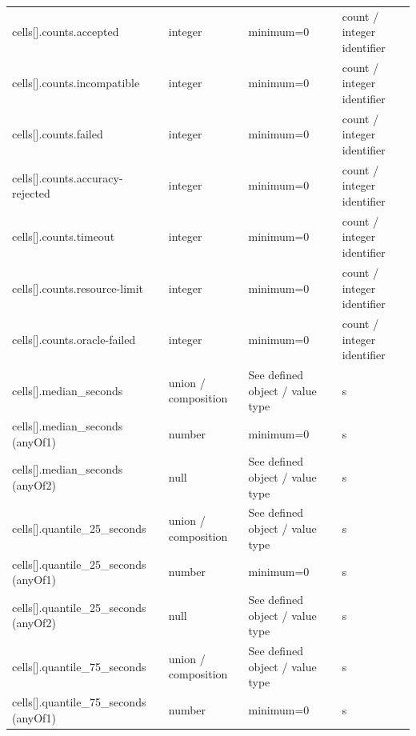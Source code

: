 \begin{longtable}{@{}>{\raggedright\arraybackslash}p{}>{\raggedright\arraybackslash}p{}>{\raggedright\arraybackslash}p{}>{\raggedright\arraybackslash}p{}@{}}
cells[].\allowbreak{}counts.\allowbreak{}accepted & integer & minimum=\allowbreak{}0 & count /\allowbreak{} integer identifier\\
cells[].\allowbreak{}counts.\allowbreak{}incompatible & integer & minimum=\allowbreak{}0 & count /\allowbreak{} integer identifier\\
cells[].\allowbreak{}counts.\allowbreak{}failed & integer & minimum=\allowbreak{}0 & count /\allowbreak{} integer identifier\\
cells[].\allowbreak{}counts.\allowbreak{}accuracy-\allowbreak{}rejected & integer & minimum=\allowbreak{}0 & count /\allowbreak{} integer identifier\\
cells[].\allowbreak{}counts.\allowbreak{}timeout & integer & minimum=\allowbreak{}0 & count /\allowbreak{} integer identifier\\
cells[].\allowbreak{}counts.\allowbreak{}resource-\allowbreak{}limit & integer & minimum=\allowbreak{}0 & count /\allowbreak{} integer identifier\\
cells[].\allowbreak{}counts.\allowbreak{}oracle-\allowbreak{}failed & integer & minimum=\allowbreak{}0 & count /\allowbreak{} integer identifier\\
cells[].\allowbreak{}median\_\allowbreak{}seconds & union /\allowbreak{} composition & See defined object /\allowbreak{} value type & s\\
cells[].\allowbreak{}median\_\allowbreak{}seconds (anyOf1) & number & minimum=\allowbreak{}0 & s\\
cells[].\allowbreak{}median\_\allowbreak{}seconds (anyOf2) & null & See defined object /\allowbreak{} value type & s\\
cells[].\allowbreak{}quantile\_\allowbreak{}25\_\allowbreak{}seconds & union /\allowbreak{} composition & See defined object /\allowbreak{} value type & s\\
cells[].\allowbreak{}quantile\_\allowbreak{}25\_\allowbreak{}seconds (anyOf1) & number & minimum=\allowbreak{}0 & s\\
cells[].\allowbreak{}quantile\_\allowbreak{}25\_\allowbreak{}seconds (anyOf2) & null & See defined object /\allowbreak{} value type & s\\
cells[].\allowbreak{}quantile\_\allowbreak{}75\_\allowbreak{}seconds & union /\allowbreak{} composition & See defined object /\allowbreak{} value type & s\\
cells[].\allowbreak{}quantile\_\allowbreak{}75\_\allowbreak{}seconds (anyOf1) & number & minimum=\allowbreak{}0 & s\\

\end{longtable}
